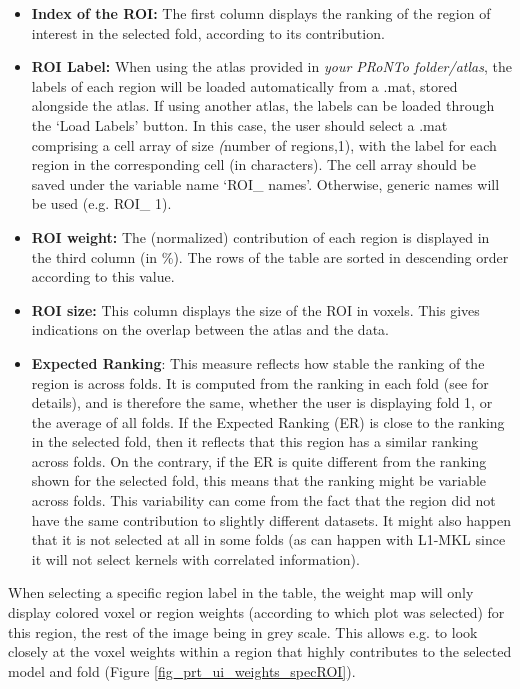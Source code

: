 \begin{itemize}
\item \textbf{Index of the ROI:} The first column displays the ranking of the region of interest in the selected fold, according to its contribution.
\item \textbf{ROI Label:} When using the atlas provided in \textit{your PRoNTo folder/atlas}, the labels of each region will be loaded automatically from a .mat, stored alongside the atlas. If using another atlas, the labels can be loaded through the `Load Labels' button. In this case, the user should select a .mat comprising a cell array of size \textit(number of regions,1), with the label for each region in the corresponding cell (in characters). The cell array should be saved under the variable name `ROI\_ names'. Otherwise, generic names will be used (e.g. ROI\_ 1).
\item \textbf{ROI weight:} The (normalized) contribution of each region is displayed in the third column (in \%). The rows of the table are sorted in descending order according to this value. 
\item \textbf{ROI size:} This column displays the size of the ROI in voxels. This gives indications on the overlap between the atlas and the data.
\item \textbf{Expected Ranking}: This measure reflects how stable the ranking of the region is across folds. It is computed from the ranking in each fold (see \cite{Schrouff2013a} for details), and is therefore the same, whether the user is displaying fold 1, or the average of all folds. If the Expected Ranking (ER) is close to the ranking in the selected fold, then it reflects that this region has a similar ranking across folds. On the contrary, if the ER is quite different from the ranking shown for the selected fold, this means that the ranking might be variable across folds. This variability can come from the fact that the region did not have the same contribution to slightly different datasets. It might also happen that it is not selected at all in some folds (as can happen with L1-MKL since it will not select kernels with correlated information).
\end{itemize}

When selecting a specific region label in the table, the weight map will only display colored voxel or region weights (according to which plot was selected) for this region, the rest of the image being in grey scale. This allows e.g. to look closely at the voxel weights within a region that highly contributes to the selected model and fold (Figure \ref{fig_prt_ui_weights_specROI}).

